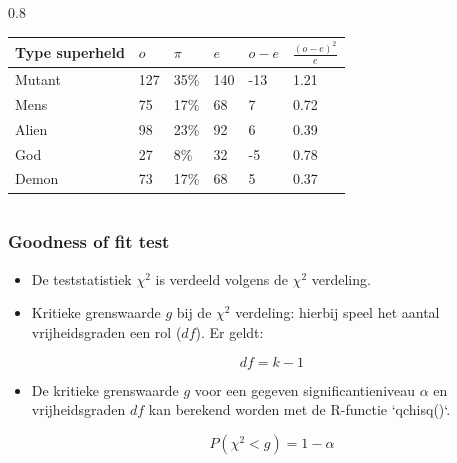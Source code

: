 \documentclass[aspectratio=169]{beamer}
\begin{document}
\begin{frame}
\begin{columns}
    \begin{column} { 0.8 \textwidth}
\begin{table}[h]
\begin{tabular}{@{}llllll@{}}
\toprule
\textbf{Type superheld} & \textbf{$o$} & \textbf{$\pi$} & \textbf{$e$} & \textbf{$o -e$} & \textbf{$\frac{(o-e)^{2}}{e}$} \\ \midrule
Mutant                  & 127          & 35\%           & 140          & -13             & 1.21                           \\
Mens                    & 75           & 17\%           & 68           & 7               & 0.72                           \\
Alien                   & 98           & 23\%           & 92           & 6               & 0.39                           \\
God                     & 27           & 8\%            & 32           & -5              & 0.78                           \\
Demon                   & 73           & 17\%           & 68           & 5               & 0.37                           \\ \bottomrule
\end{tabular}
\end{table}
    \end{column}
  \end{columns}
\end{frame}


\begin{frame}
  \frametitle{Goodness of fit test}

  \begin{itemize}
    \item De teststatistiek $\chi^{2}$ is verdeeld volgens de $\chi^2$ verdeling.
    \item Kritieke grenswaarde $g$ bij de $\chi^{2}$ verdeling: hierbij speel het aantal vrijheidsgraden een rol ($df$). Er geldt:

      \[ df = k -1 \]

    \item De kritieke grenswaarde $g$ voor een gegeven significantieniveau $\alpha$ en vrijheidsgraden $df$ kan berekend worden met de R-functie `qchisq()`.
    
      \[ P(\chi^2 < g) = 1 - \alpha \]
  \end{itemize}
\end{frame}
\end{document}
